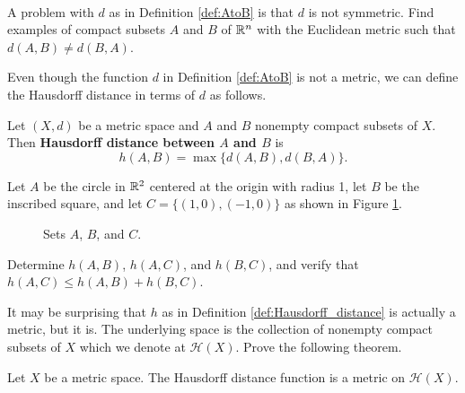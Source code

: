 \begin{activity} ~
\ba

\item A problem with $d$ as in Definition \ref{def:AtoB} is that $d$ is not symmetric. Find examples of compact subsets $A$ and $B$ of $\mathbb{R}^n$ with the Euclidean metric such that $d(A,B) \neq d(B,A)$. 

\item Even though the function $d$ in Definition \ref{def:AtoB} is not a metric, we can define the Hausdorff distance  in terms of $d$ as follows. 

\begin{definition} \label{def:Hausdorff_distance} Let $(X,d)$ be a metric space and $A$ and $B$ nonempty compact subsets of $X$. Then \textbf{Hausdorff distance between $A$ and $B$} is 
\[h(A,B) = \max\{d(A,B), d(B,A)\}.\]
\end{definition}

Let $A$ be the circle in $\mathbb{R}^2$ centered at the origin with radius 1, let $B$ be the inscribed square, and let $C = \{(1,0), (-1,0)\}$ as shown in Figure \ref{F:Hausdorff_Example}.
\begin{figure}[t]
\begin{center}
\caption{Sets $A$, $B$, and $C$.}
\label{F:Hausdorff_Example}
\end{center}
\end{figure}

Determine $h(A,B)$, $h(A,C)$, and $h(B,C)$, and verify that $h(A,C) \leq h(A,B) + h(B,C)$. 
	
\item It may be surprising that $h$ as in Definition \ref{def:Hausdorff_distance} is actually a metric, but it is. The underlying space is the collection of nonempty compact subsets of $X$ which we denote at $\mathcal{H}(X)$. Prove the following theorem.

\begin{theorem} Let $X$ be a metric space. The Hausdorff distance function is a metric on $\mathcal{H}(X)$.
\end{theorem}


\end{activity}
